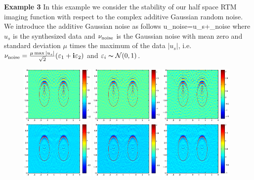 \documentclass[12pt]{iopart}
\begin{document}
\bigskip
\textbf{Example 3}
In this example we consider the stability of our half space RTM imaging
function with respect to the complex additive Gaussian random noise. We introduce
the additive Gaussian noise as follows
\ben
u_{\rm noise}=u_s+\nu_{\rm noise}
\een
where $u_s$ is the synthesized data and $\nu_{\rm noise}$ is the Gaussian noise with mean zero and standard deviation $\mu$ times the maximum of  the data $|u_s|$, i.e. $\nu_{\rm noise}=\frac{\mu \max |u_s|}{\sqrt{2}}(\varepsilon_1+\mathbf{i}\varepsilon_2)$ and  $\varepsilon_i
\thicksim \mathcal{N}(0,1)$.
\begin{figure}
	\centering
	\includegraphics[width=0.32\textwidth]{./graphic/bi_circle_4pi_error2.eps}
	\includegraphics[width=0.32\textwidth]{./graphic/bi_circle_4pi_error4.eps}
	\includegraphics[width=0.32\textwidth]{./graphic/bi_circle_4pi_error6.eps}
	\includegraphics[width=0.32\textwidth]{./graphic/bi_circle_multi_2_8_error2.eps}
	\includegraphics[width=0.32\textwidth]{./graphic/bi_circle_multi_2_8_error4.eps}
	\includegraphics[width=0.32\textwidth]{./graphic/bi_circle_multi_2_8_error6.eps}
	

\end{figure}
\end{document}
